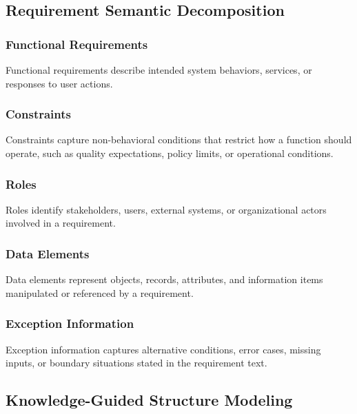 \subsection{Requirement Semantic Decomposition}
\label{sec:method-decomposition}

\subsubsection{Functional Requirements}
\label{sec:method-functional}

Functional requirements describe intended system behaviors, services, or responses to user actions.

\subsubsection{Constraints}
\label{sec:method-constraints}

Constraints capture non-behavioral conditions that restrict how a function should operate, such as quality expectations, policy limits, or operational conditions.

\subsubsection{Roles}
\label{sec:method-roles}

Roles identify stakeholders, users, external systems, or organizational actors involved in a requirement.

\subsubsection{Data Elements}
\label{sec:method-data}

Data elements represent objects, records, attributes, and information items manipulated or referenced by a requirement.

\subsubsection{Exception Information}
\label{sec:method-exceptions}

Exception information captures alternative conditions, error cases, missing inputs, or boundary situations stated in the requirement text.

\subsection{Knowledge-Guided Structure Modeling}
\label{sec:method-knowledge}


